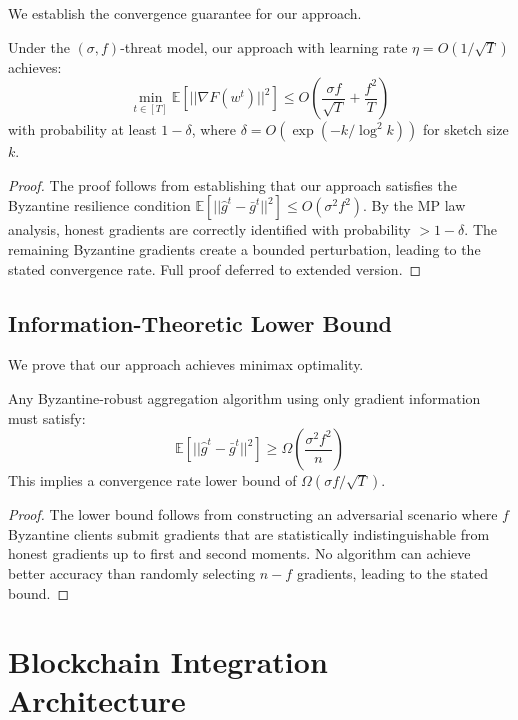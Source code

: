 \documentclass[runningheads]{llncs}
\begin{document}
We establish the convergence guarantee for our approach.

\begin{theorem}
Under the $(\sigma, f)$-threat model, our approach with learning rate $\eta = O(1/\sqrt{T})$ achieves:
\begin{equation}
\min_{t \in [T]} \mathbb{E}[||\nabla F(w^t)||^2] \leq O\left(\frac{\sigma f}{\sqrt{T}} + \frac{f^2}{T}\right)
\end{equation}
with probability at least $1 - \delta$, where $\delta = O(\exp(-k/\log^2 k))$ for sketch size $k$.
\end{theorem}

\begin{proof}
The proof follows from establishing that our approach satisfies the Byzantine resilience condition $\mathbb{E}[||\hat{g}^t - \bar{g}^t||^2] \leq O(\sigma^2 f^2)$. By the MP law analysis, honest gradients are correctly identified with probability $> 1 - \delta$. The remaining Byzantine gradients create a bounded perturbation, leading to the stated convergence rate. Full proof deferred to extended version.
\end{proof}

\subsection{Information-Theoretic Lower Bound}

We prove that our approach achieves minimax optimality.

\begin{theorem}
Any Byzantine-robust aggregation algorithm using only gradient information must satisfy:
\begin{equation}
\mathbb{E}[||\hat{g}^t - \bar{g}^t||^2] \geq \Omega\left(\frac{\sigma^2 f^2}{n}\right)
\end{equation}
This implies a convergence rate lower bound of $\Omega(\sigma f/\sqrt{T})$.
\end{theorem}

\begin{proof}
The lower bound follows from constructing an adversarial scenario where $f$ Byzantine clients submit gradients that are statistically indistinguishable from honest gradients up to first and second moments. No algorithm can achieve better accuracy than randomly selecting $n-f$ gradients, leading to the stated bound.
\end{proof}

\section{Blockchain Integration Architecture}
\end{document}

